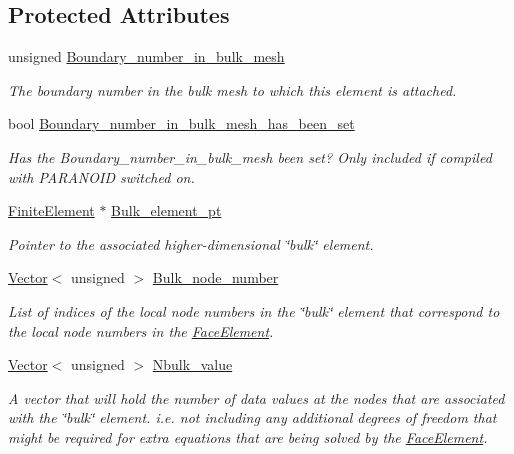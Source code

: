 \subsection*{Protected Attributes}
\begin{DoxyCompactItemize}
\item 
unsigned \hyperlink{classoomph_1_1FaceElement_a12768f6229f232be88da7dfa10fd87be}{Boundary\+\_\+number\+\_\+in\+\_\+bulk\+\_\+mesh}
\begin{DoxyCompactList}\small\item\em The boundary number in the bulk mesh to which this element is attached. \end{DoxyCompactList}\item 
bool \hyperlink{classoomph_1_1FaceElement_a113a0f8d3d26af5e684b549e9a44a37e}{Boundary\+\_\+number\+\_\+in\+\_\+bulk\+\_\+mesh\+\_\+has\+\_\+been\+\_\+set}
\begin{DoxyCompactList}\small\item\em Has the Boundary\+\_\+number\+\_\+in\+\_\+bulk\+\_\+mesh been set? Only included if compiled with P\+A\+R\+A\+N\+O\+ID switched on. \end{DoxyCompactList}\item 
\hyperlink{classoomph_1_1FiniteElement}{Finite\+Element} $\ast$ \hyperlink{classoomph_1_1FaceElement_a2d616b77ff557bbc70ece741fa2c6d96}{Bulk\+\_\+element\+\_\+pt}
\begin{DoxyCompactList}\small\item\em Pointer to the associated higher-\/dimensional \char`\"{}bulk\char`\"{} element. \end{DoxyCompactList}\item 
\hyperlink{classoomph_1_1Vector}{Vector}$<$ unsigned $>$ \hyperlink{classoomph_1_1FaceElement_a27a8a3240049a53c7fac20ebde716846}{Bulk\+\_\+node\+\_\+number}
\begin{DoxyCompactList}\small\item\em List of indices of the local node numbers in the \char`\"{}bulk\char`\"{} element that correspond to the local node numbers in the \hyperlink{classoomph_1_1FaceElement}{Face\+Element}. \end{DoxyCompactList}\item 
\hyperlink{classoomph_1_1Vector}{Vector}$<$ unsigned $>$ \hyperlink{classoomph_1_1FaceElement_abd04b85066da626341294b5f0b97516e}{Nbulk\+\_\+value}
\begin{DoxyCompactList}\small\item\em A vector that will hold the number of data values at the nodes that are associated with the \char`\"{}bulk\char`\"{} element. i.\+e. not including any additional degrees of freedom that might be required for extra equations that are being solved by the \hyperlink{classoomph_1_1FaceElement}{Face\+Element}. \end{DoxyCompactList}\item 

\end{DoxyCompactItemize}
